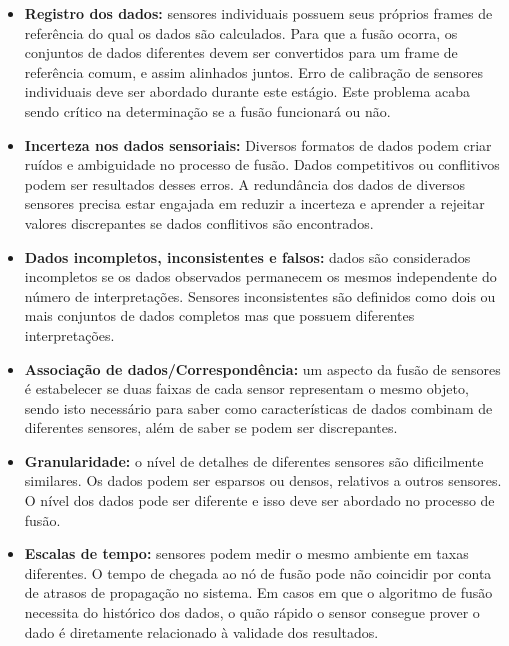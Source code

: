 \documentclass[acronym, symbols, table, deposito]{fei}
\begin{document}
			\begin{itemize}
				\item \textbf{Registro dos dados:} sensores individuais possuem seus próprios frames de referência do qual os dados são calculados. Para que a fusão ocorra, os conjuntos de dados diferentes devem ser convertidos para um frame de referência comum, e assim alinhados juntos. Erro de calibração de sensores individuais deve ser abordado durante este estágio. Este problema acaba sendo crítico na determinação se a fusão funcionará ou não.
				
				\item \textbf{Incerteza nos dados sensoriais:} Diversos formatos de dados podem criar ruídos e ambiguidade no processo de fusão. Dados competitivos ou conflitivos podem ser resultados desses erros. A redundância dos dados de diversos sensores precisa estar engajada em reduzir a incerteza e aprender a rejeitar valores discrepantes se dados conflitivos são encontrados.
				
				\item \textbf{Dados incompletos, inconsistentes e falsos:} dados são considerados incompletos se os dados observados permanecem os mesmos independente do número de interpretações. Sensores inconsistentes são definidos como dois ou mais conjuntos de dados completos mas que possuem diferentes interpretações.
				
				\item \textbf{Associação de dados/Correspondência:} um aspecto da fusão de sensores é estabelecer se duas faixas de cada sensor representam o mesmo objeto, sendo isto necessário para saber como características de dados combinam de diferentes sensores, além de saber se podem ser discrepantes. 
				
				\item \textbf{Granularidade:} o nível de detalhes de diferentes sensores são dificilmente similares. Os dados podem ser esparsos ou densos, relativos a outros sensores. O nível dos dados pode ser diferente e isso deve ser abordado no processo de fusão.
				
				\item \textbf{Escalas de tempo:} sensores podem medir o mesmo ambiente em taxas diferentes. O tempo de chegada ao nó de fusão pode não coincidir por conta de atrasos de propagação no sistema. Em casos em que o algoritmo de fusão necessita do histórico dos dados, o quão rápido o sensor consegue prover o dado é diretamente relacionado à validade dos resultados.
			\end{itemize}
		
\end{document}
